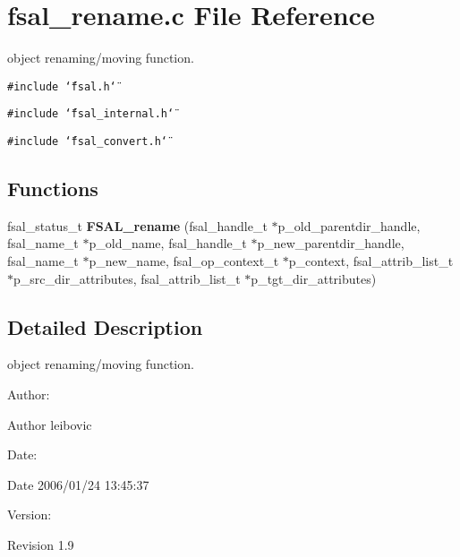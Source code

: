 \section{fsal\_\-rename.c File Reference}
\label{fsal__rename_8c}
object renaming/moving function. 

{\tt \#include \char`\"{}fsal.h\char`\"{}}\par
{\tt \#include \char`\"{}fsal\_\-internal.h\char`\"{}}\par
{\tt \#include \char`\"{}fsal\_\-convert.h\char`\"{}}\par
\subsection*{Functions}
\begin{CompactItemize}
\item 
fsal\_\-status\_\-t {\bf FSAL\_\-rename} (fsal\_\-handle\_\-t $\ast$p\_\-old\_\-parentdir\_\-handle, fsal\_\-name\_\-t $\ast$p\_\-old\_\-name, fsal\_\-handle\_\-t $\ast$p\_\-new\_\-parentdir\_\-handle, fsal\_\-name\_\-t $\ast$p\_\-new\_\-name, fsal\_\-op\_\-context\_\-t $\ast$p\_\-context, fsal\_\-attrib\_\-list\_\-t $\ast$p\_\-src\_\-dir\_\-attributes, fsal\_\-attrib\_\-list\_\-t $\ast$p\_\-tgt\_\-dir\_\-attributes)
\end{CompactItemize}


\subsection{Detailed Description}
object renaming/moving function. 

\begin{Desc}
\item[Author:]\begin{Desc}
\item[Author]leibovic \end{Desc}
\end{Desc}
\begin{Desc}
\item[Date:]\begin{Desc}
\item[Date]2006/01/24 13:45:37 \end{Desc}
\end{Desc}
\begin{Desc}
\item[Version:]\begin{Desc}
\item[Revision]1.9 \end{Desc}
\end{Desc}


